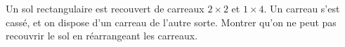 Un sol rectangulaire est recouvert de carreaux $2 \times 2$ et $1 \times 4$. Un carreau s'est cassé, et on dispose d'un carreau de l'autre sorte. Montrer qu'on ne peut pas recouvrir le sol en réarrangeant les carreaux.
